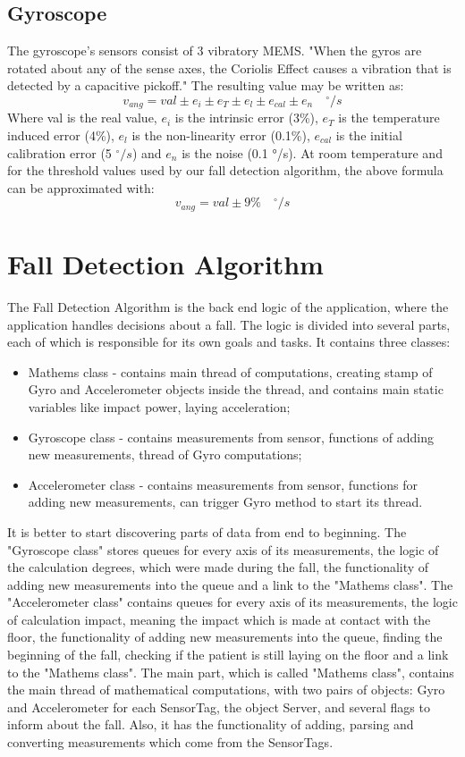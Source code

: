 \documentclass[hidelinks,conference,12pt]{IEEETran}
\begin{document}
\subsection{Gyroscope}
The gyroscope’s sensors consist of 3 vibratory MEMS. "When the gyros are rotated about any of the sense axes, the Coriolis Effect causes a vibration that is detected by a capacitive pickoff." The resulting value may be written as:
$$ v_{ang} = val \pm e_i  \pm e_T \pm e_l \pm e_{cal} \pm e_n \quad ^{\circ}/s $$
Where val is the real value, $e_i$ is the intrinsic error (3\%), $e_T$ is the temperature induced error (4\%), $e_l$ is the non-linearity error (0.1\%), $e_{cal}$ is the initial calibration error (5 $^{\circ}/s$) and $e_n$ is the noise (0.1 °/s). At room temperature and for the threshold values used by our fall detection algorithm, the above formula can be approximated with:
$$ v_{ang} = val \pm 9\% \quad ^{\circ}/s $$


\section{Fall Detection Algorithm}
The Fall Detection Algorithm is the back end logic of the application, where the application handles decisions about a fall. The logic is divided into several parts, each of which is responsible for its own goals and tasks. It contains three classes:
\begin{itemize}
	\item Mathems class - contains main thread of computations, creating stamp of Gyro and Accelerometer objects inside the thread, and contains main static variables like impact power, laying acceleration;
	\item Gyroscope class - contains measurements from sensor, functions of adding new measurements, thread of Gyro computations;
	\item Accelerometer class - contains measurements from sensor, functions for adding new measurements, can trigger Gyro method to start its thread.
\end{itemize}
It is better to start discovering parts of data from end to beginning. The "Gyroscope class" stores queues for every axis of its measurements, the logic of the calculation degrees, which were made during the fall, the functionality of adding new measurements into the queue and a link to the "Mathems class". The "Accelerometer class" contains queues for every axis of its measurements, the logic of calculation impact, meaning the impact which is made at contact with the floor, the functionality of adding new measurements into the queue, finding the beginning of the fall, checking if the patient is still laying on the floor and a link to the "Mathems class". The main part, which is called "Mathems class", contains the main thread of mathematical computations, with two pairs of objects: Gyro and Accelerometer for each SensorTag, the object Server, and several flags to inform about the fall. Also, it has the functionality of adding, parsing and converting measurements which come from the SensorTags.
\end{document}

